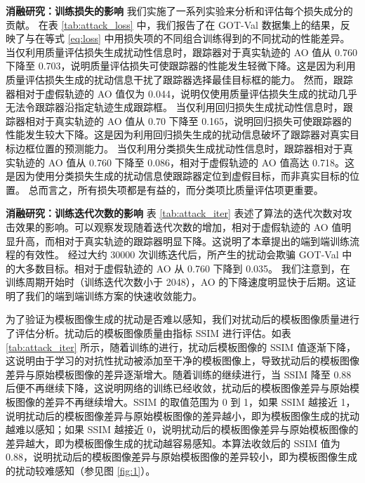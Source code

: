 \textbf{消融研究：训练损失的影响} 我们实施了一系列实验来分析和评估每个损失成分的贡献。
在表 \ref{tab:attack_loss} 中，我们报告了在 GOT-Val 数据集上的结果，反映了与在等式 \ref{eq:loss} 中用损失项的不同组合训练得到的不同扰动的性能差异。
当仅利用质量评估损失生成扰动性信息时，跟踪器对于真实轨迹的 AO 值从 0.760 下降至 0.703，说明质量评估损失可使跟踪器的性能发生轻微下降。这是因为利用质量评估损失生成的扰动信息干扰了跟踪器选择最佳目标框的能力。
然而，跟踪器相对于虚假轨迹的 AO 值仅为 0.044，说明仅使用质量评估损失生成的扰动几乎无法令跟踪器沿指定轨迹生成跟踪框。
当仅利用回归损失生成扰动性信息时，跟踪器相对于真实轨迹的 AO 值从 0.70 下降至 0.165，说明回归损失可使跟踪器的性能发生较大下降。这是因为利用回归损失生成的扰动信息破坏了跟踪器对真实目标边框位置的预测能力。
当仅利用分类损失生成扰动性信息时，跟踪器相对于真实轨迹的 AO 值从 0.760 下降至 0.086，相对于虚假轨迹的 AO 值高达 0.718。这是因为使用分类损失生成的扰动信息使跟踪器定位到虚假目标，而非真实目标的位置。
总而言之，所有损失项都是有益的，而分类项比质量评估项更重要。

\textbf{消融研究：训练迭代次数的影响} 表 \ref{tab:attack_iter} 表述了算法的迭代次数对攻击效果的影响。可以观察发现随着迭代次数的增加，相对于虚假轨迹的 AO 值明显升高，而相对于真实轨迹的跟踪器明显下降。这说明了本章提出的端到端训练流程的有效性。
经过大约 30000 次训练迭代后，所产生的扰动会欺骗 GOT-Val 中的大多数目标。相对于虚假轨迹的 AO 从 0.760 下降到 0.035。
我们注意到，在训练周期开始时（训练迭代次数小于 2048），AO 的下降速度明显快于后期。这证明了我们的端到端训练方案的快速收敛能力。

为了验证为模板图像生成的扰动是否难以感知，我们对扰动后的模板图像质量进行了评估分析。扰动后的模板图像质量由指标 SSIM 进行评估。如表 \ref{tab:attack_iter} 所示，随着训练的进行，扰动后模板图像的 SSIM 值逐渐下降，这说明由于学习的对抗性扰动被添加至干净的模板图像上，导致扰动后的模板图像差异与原始模板图像的差异逐渐增大。随着训练的继续进行，当 SSIM 降至 0.88 后便不再继续下降，这说明网络的训练已经收敛，扰动后的模板图像差异与原始模板图像的差异不再继续增大。SSIM 的取值范围为 0 到 1，如果 SSIM 越接近 1，说明扰动后的模板图像差异与原始模板图像的差异越小，即为模板图像生成的扰动越难以感知；如果 SSIM 越接近 0，说明扰动后的模板图像差异与原始模板图像的差异越大，即为模板图像生成的扰动越容易感知。本算法收敛后的 SSIM 值为 0.88，说明扰动后的模板图像差异与原始模板图像的差异较小，即为模板图像生成的扰动较难感知（参见图 \ref{fig:1}）。


